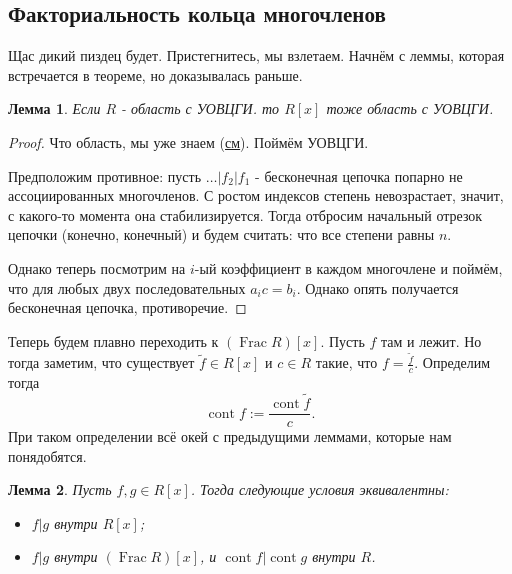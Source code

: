 \documentclass[a4paper,100pt]{article}
\theoremstyle{indented}
\newtheorem{lemma}{Лемма}
\theoremstyle{definition}
\theoremstyle{remark}
\DeclareMathOperator{\Frac}{Frac}
\DeclareMathOperator{\cont}{cont}
\begin{document}
\resetall

\subsection{Факториальность кольца многочленов}

Щас дикий пиздец будет. Пристегнитесь, мы взлетаем. Начнём с леммы, которая встречается в теореме, но доказывалась раньше.\\

\begin{lemma}
    Если $R$ - область с УОВЦГИ. то $R[x]$ тоже область с УОВЦГИ.
\end{lemma}

\begin{proof}
    Что область, мы уже знаем (\hyperlink{t3}{см}). Поймём УОВЦГИ.\ 

    Предположим противное: пусть $\dots \vert f_2\vert f_1$ - бесконечная цепочка попарно не ассоциированных многочленов. С ростом индексов степень невозрастает, значит, с какого-то момента она стабилизируется. Тогда отбросим начальный отрезок цепочки (конечно, конечный) и будем считать: что все степени равны $n$.\ 

    Однако теперь посмотрим на $i$-ый коэффициент в каждом многочлене и поймём, что для любых двух последовательных $a_i c=b_i$. Однако опять получается бесконечная цепочка, противоречие.
\end{proof}

Теперь будем плавно переходить к $(\Frac R)[x]$. Пусть $f$ там и лежит. Но тогда заметим, что существует $\tilde{f}\in R[x]$ и $c\in R$ такие, что $f=\frac{\tilde{f}}{c}$. Определим тогда 
\[
    \cont f:=\frac{\cont \tilde{f}}{c}.
\]
При таком определении всё окей с предыдущими леммами, которые нам понядобятся.\\

\begin{lemma}
    Пусть $f, g\in R[x]$. Тогда следующие условия эквивалентны:\
    
    \begin{itemize}
        \item $f\vert g$ внутри $R[x]$;
        \item $f\vert g$ внутри $(\Frac R)[x]$, и $\cont f\vert \cont g$ внутри $R$.
    \end{itemize}
\end{lemma}
\end{document}
